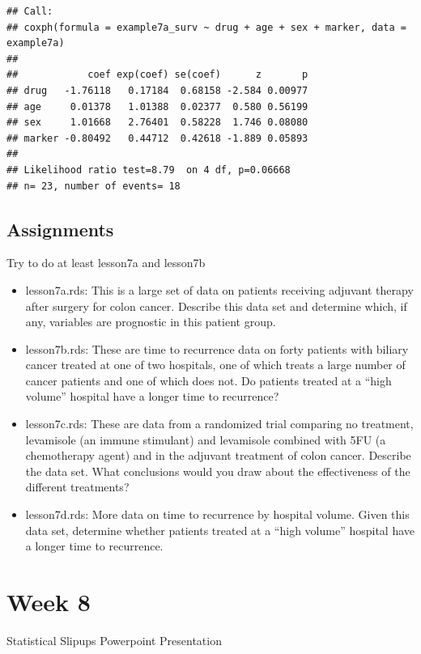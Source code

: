 \documentclass[]{book}
\begin{document}
\begin{verbatim}
## Call:
## coxph(formula = example7a_surv ~ drug + age + sex + marker, data = example7a)
## 
##            coef exp(coef) se(coef)      z       p
## drug   -1.76118   0.17184  0.68158 -2.584 0.00977
## age     0.01378   1.01388  0.02377  0.580 0.56199
## sex     1.01668   2.76401  0.58228  1.746 0.08080
## marker -0.80492   0.44712  0.42618 -1.889 0.05893
## 
## Likelihood ratio test=8.79  on 4 df, p=0.06668
## n= 23, number of events= 18
\end{verbatim}

\hypertarget{assignments-6}{%
\section{Assignments}\label{assignments-6}}

Try to do at least lesson7a and lesson7b

\begin{itemize}
\item
  lesson7a.rds: This is a large set of data on patients receiving
  adjuvant therapy after surgery for colon cancer. Describe this data
  set and determine which, if any, variables are prognostic in this
  patient group.
\item
  lesson7b.rds: These are time to recurrence data on forty patients with
  biliary cancer treated at one of two hospitals, one of which treats a
  large number of cancer patients and one of which does not. Do patients
  treated at a ``high volume'' hospital have a longer time to
  recurrence?
\item
  lesson7c.rds: These are data from a randomized trial comparing no
  treatment, levamisole (an immune stimulant) and levamisole combined
  with 5FU (a chemotherapy agent) and in the adjuvant treatment of colon
  cancer. Describe the data set. What conclusions would you draw about
  the effectiveness of the different treatments?
\item
  lesson7d.rds: More data on time to recurrence by hospital volume.
  Given this data set, determine whether patients treated at a ``high
  volume'' hospital have a longer time to recurrence.
\end{itemize}

\hypertarget{week-8}{%
\chapter{Week 8}\label{week-8}}

Statistical Slipups Powerpoint Presentation
\end{document}
